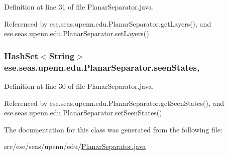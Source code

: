 Definition at line 31 of file Planar\+Separator.\+java.



Referenced by ese.\+seas.\+upenn.\+edu.\+Planar\+Separator.\+get\+Layers(), and ese.\+seas.\+upenn.\+edu.\+Planar\+Separator.\+set\+Layers().

\hypertarget{classese_1_1seas_1_1upenn_1_1edu_1_1_planar_separator_a5c89ea3190aa6feb4ba3205ee17d095d}{}
\subsubsection[{seen\+States}]{\setlength{\rightskip}{0pt plus 5cm}Hash\+Set$<$String$>$ ese.\+seas.\+upenn.\+edu.\+Planar\+Separator.\+seen\+States\hspace{0.3cm}{\ttfamily [static]}, {\ttfamily [private]}}\label{classese_1_1seas_1_1upenn_1_1edu_1_1_planar_separator_a5c89ea3190aa6feb4ba3205ee17d095d}


Definition at line 30 of file Planar\+Separator.\+java.



Referenced by ese.\+seas.\+upenn.\+edu.\+Planar\+Separator.\+get\+Seen\+States(), and ese.\+seas.\+upenn.\+edu.\+Planar\+Separator.\+set\+Seen\+States().



The documentation for this class was generated from the following file\+:\begin{DoxyCompactItemize}
\item 
src/ese/seas/upenn/edu/\hyperlink{_planar_separator_8java}{Planar\+Separator.\+java}\end{DoxyCompactItemize}
